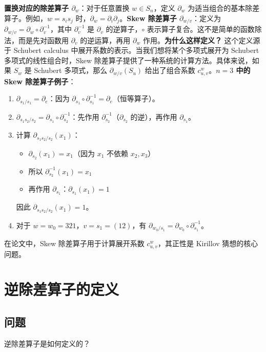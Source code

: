 \textbf{置换对应的除差算子 $\partial_w$}：对于任意置换 $w \in S_n$，定义 $\partial_w$ 为适当组合的基本除差算子。例如，$w = s_i s_j$ 时，$\partial_w = \partial_i \partial_j$。\textbf{Skew 除差算子 $\partial_{w/v}$}：定义为 $\partial_{w/v} = \partial_w \circ \partial_v^{-1}$，其中 $\partial_v^{-1}$ 是 $\partial_v$ 的逆算子，$\circ$ 表示算子复合。这不是简单的函数除法，而是先对函数用 $\partial_v$ 的逆运算，再用 $\partial_w$ 作用。\textbf{为什么这样定义？} 这个定义源于 Schubert calculus 中展开系数的表示。当我们想将某个多项式展开为 Schubert 多项式的线性组合时，Skew 除差算子提供了一种系统的计算方法。具体来说，如果 $S_w$ 是 Schubert 多项式，那么 $\partial_{w/v}(S_u)$ 给出了组合系数 $c^w_{u,v}$。\textbf{$n=3$ 中的 Skew 除差算子例子}：
\begin{enumerate}
\item $\partial_{s_1 / s_1} = \partial_{e}$：因为 $\partial_{s_1} \circ \partial_{s_1}^{-1} = \partial_{e}$（恒等算子）。\item $\partial_{s_1 s_2 / s_2} = \partial_{s_1} \circ \partial_{s_2}^{-1}$：先作用 $\partial_{s_2}^{-1}$（$\partial_{s_2}$ 的逆），再作用 $\partial_{s_1}$。\item 计算 $\partial_{s_1 s_2 / s_2}(x_1)$：    
\begin{itemize}    \item $\partial_{s_2}(x_1) = x_1$（因为 $x_1$ 不依赖 $x_2, x_3$）    \item 所以 $\partial_{s_2}^{-1}(x_1) = x_1$    \item 再作用 $\partial_{s_1}$：$\partial_{s_1}(x_1) = 1$    
\end{itemize}    因此 $\partial_{s_1 s_2 / s_2}(x_1) = 1$。\item 对于 $w = w_0 = 321$，$v = s_1 = (12)$，有 $\partial_{w_0 / s_1} = \partial_{w_0} \circ \partial_{s_1}^{-1}$。
\end{enumerate}

在论文中，Skew 除差算子用于计算展开系数 $c^w_{u,v}$，其正性是 Kirillov 猜想的核心问题。
\section{逆除差算子的定义}\label{sec:InverseDividedDifference}
\subsection{问题}
逆除差算子是如何定义的？
